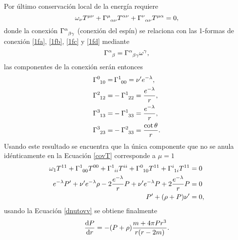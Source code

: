 Por último conservación local de la energía requiere
\begin{equation}
      \omega_{\nu} \tensor{T}{^\mu ^\nu} + \tensor{\Gamma}{^\mu _\alpha _\nu}\tensor{T}{^\alpha ^\nu} + \tensor{\Gamma}{^\nu _\alpha _\nu}\tensor{T}{^\mu ^\alpha} = 0, \label{covT}
\end{equation}
donde la conexión $\tensor{\Gamma}{^\alpha _\beta _\gamma}$ (conexión del espín) se relaciona con las 1-formas de conexión \eqref{1fa}, \eqref{1fb}, \eqref{1fc} y \eqref{1fd} mediante
\begin{equation}
    \tensor{\Gamma}{^\alpha _\beta} = \tensor{\Gamma}{^\alpha _\beta _\gamma} \omega^\gamma, 
\end{equation}
las componentes de la conexión serán entonces
\begin{align}
        \tensor{\Gamma}{^0_1_0} =& \,\tensor{\Gamma}{^1_0_0} = \nu^{\prime} e^{-\lambda}, \label{sca} \\
        \tensor{\Gamma}{^2_1_2} =& -\tensor{\Gamma}{^1_2_2} = \frac{e^{-\lambda}}{r}, \label{scb} \\
        \tensor{\Gamma}{^3_1_3} =& -\tensor{\Gamma}{^1_3_3} = \frac{e^{-\lambda}}{r}, \label{scc} \\
        \tensor{\Gamma}{^3_2_3} =& -\tensor{\Gamma}{^2_3_3} = \frac{\cot{\theta}}{r} . \label{scd}
    \end{align}
Usando este resultado se encuentra que la única componente que no se anula idénticamente en la Ecuación \eqref{covT} corresponde a $\mu=1$
\begin{align*}
    \omega_{1} \tensor{T}{^1 ^1} + \tensor{\Gamma}{^1 _0 _0}\tensor{T}{^0 ^0} + \tensor{\Gamma}{^1 _i _i}\tensor{T}{^i ^i} + \tensor{\Gamma}{^0 _1 _0}\tensor{T}{^1 ^1} + \tensor{\Gamma}{^i _1 _i}\tensor{T}{^1 ^1} &= 0 \\
    e^{-\lambda} P^{\prime} + \nu^{\prime} e^{-\lambda} \rho -2 \frac{e^{-\lambda}}{r} P + \nu^{\prime} e^{-\lambda} P  + 2\frac{e^{-\lambda}}{r} P  &= 0 \\
    P^{\prime} + (\rho + P) \nu^{\prime} &= 0,
\end{align*}
usando la Ecuación \eqref{dnutovv} se obtiene finalmente
\begin{equation}
    \dv{P}{r} = -(P+\rho)\frac{m+4\pi P r^3}{r\qty(r-2m)}.\label{dptovv}
\end{equation}
